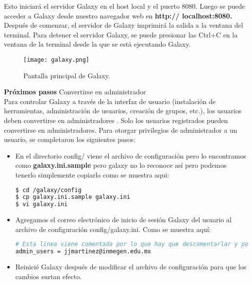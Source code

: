 \documentclass[12pt,letterpaper]{article}
\begin{document}
Esto iniciará el servidor Galaxy en el host local y el puerto 8080. Luego se puede acceder a Galaxy desde nuestro navegador web en \textbf{http:// localhost:8080.} Después de comenzar, el servidor de Galaxy imprimirá la salida a la ventana del terminal. Para detener el servidor Galaxy, se puede presionar las  Ctrl+C en la ventana de la terminal desde la que se está ejecutando Galaxy.

\begin{figure}[h]
\begin{center}
\texttt{[image: galaxy.png]}
\end{center}
\caption{Pantalla principal de Galaxy.}
\end{figure}

\textbf{Próximos pasos}
Convertirse en administrador\\

Para controlar Galaxy a través de la interfaz de usuario (instalación de herramientas, administración de usuarios, creación de grupos, etc.), los usuarios deben convertirse en administradores . Solo los usuarios registrados pueden convertirse en administradores. Para otorgar privilegios de administrador a un usuario, se completaron los siguientes pasos:\\
\begin{itemize}
\item En el directorio config/ viene el archivo de configuración pero lo encontramos como \textbf{galaxy.ini.sample} pero galaxy no lo reconoce así pero podemos tenerlo simplemente copiarlo como se muestra aqui:\\

\begin{lstlisting}[language=bash, style=consola]
$ cd /galaxy/config
$ cp galaxy.ini.sample galaxy.ini
$ vi galaxy.ini
\end{lstlisting}

\item Agregamos el correo electrónico de inicio de sesión Galaxy del usuario al archivo de configuración config/galaxy.ini. Como se muestra aquí:\\
\begin{lstlisting}[language=bash, style=consola]
# Esta linea viene comentada por lo que hay que descomentarlar y ponemos:
admin_users = jjmartinez@inmegen.edu.mx
\end{lstlisting}
\item Reinicié Galaxy después de modificar el archivo de configuración para que los cambios surtan efecto.

\end{itemize}
\end{document}

